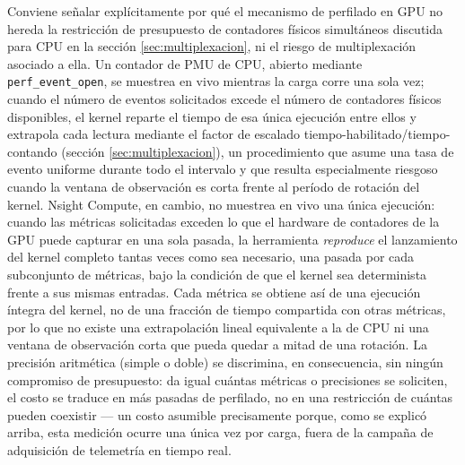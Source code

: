 \documentclass[12pt,oneside,spanish]{book}
\begin{document}
Conviene señalar explícitamente por qué el mecanismo de perfilado en GPU no hereda la restricción de presupuesto de contadores físicos simultáneos discutida para CPU en la sección \ref{sec:multiplexacion}, ni el riesgo de multiplexación asociado a ella. Un contador de PMU de CPU, abierto mediante \texttt{perf\_event\_open}, se muestrea en vivo mientras la carga corre una sola vez; cuando el número de eventos solicitados excede el número de contadores físicos disponibles, el kernel reparte el tiempo de esa única ejecución entre ellos y extrapola cada lectura mediante el factor de escalado tiempo-habilitado/tiempo-contando (sección \ref{sec:multiplexacion}), un procedimiento que asume una tasa de evento uniforme durante todo el intervalo y que resulta especialmente riesgoso cuando la ventana de observación es corta frente al período de rotación del kernel. Nsight Compute, en cambio, no muestrea en vivo una única ejecución: cuando las métricas solicitadas exceden lo que el hardware de contadores de la GPU puede capturar en una sola pasada, la herramienta \textit{reproduce} el lanzamiento del kernel completo tantas veces como sea necesario, una pasada por cada subconjunto de métricas, bajo la condición de que el kernel sea determinista frente a sus mismas entradas. Cada métrica se obtiene así de una ejecución íntegra del kernel, no de una fracción de tiempo compartida con otras métricas, por lo que no existe una extrapolación lineal equivalente a la de CPU ni una ventana de observación corta que pueda quedar a mitad de una rotación. La precisión aritmética (simple o doble) se discrimina, en consecuencia, sin ningún compromiso de presupuesto: da igual cuántas métricas o precisiones se soliciten, el costo se traduce en más pasadas de perfilado, no en una restricción de cuántas pueden coexistir --- un costo asumible precisamente porque, como se explicó arriba, esta medición ocurre una única vez por carga, fuera de la campaña de adquisición de telemetría en tiempo real.
\end{document}
